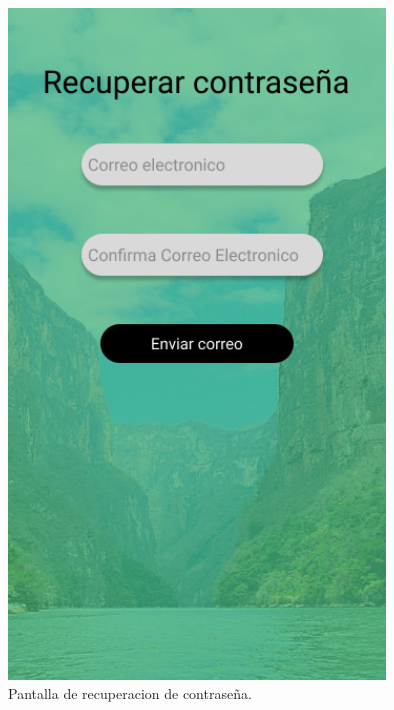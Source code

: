 \begin{figure}[htb]
    \centering
    \includegraphics[width=10cm]{pantalla3.png}
    \caption{Pantalla de recuperacion de contraseña.}
    \label{fig:enter-label}
\end{figure}

